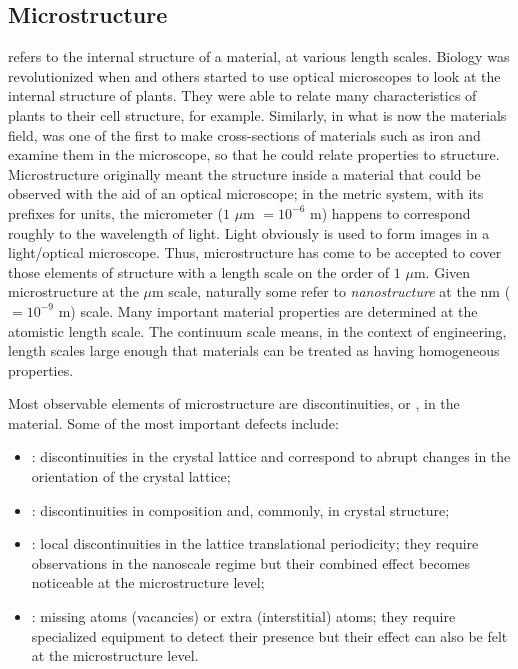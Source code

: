 \subsection{Microstructure\label{\chabbr:ssec:microstructures}}
 refers to the internal structure of a material, at various length scales.  Biology was revolutionized when  and others started to use optical microscopes to look at the internal structure of plants.  They were able to relate many characteristics of plants to their cell structure, for example.  Similarly, in what is now the materials field,  was one of the first to make cross-sections of materials such as iron and examine them in the microscope, so that he could relate properties to structure.  Microstructure originally meant the structure inside a material that could be observed with the aid of an optical microscope; in the metric system, with its prefixes for units, the micrometer ($1$ $\mu$m $= 10^{-6}$ m) happens to correspond roughly to the wavelength of light.  Light obviously is used to form images in a light/optical microscope.  Thus, microstructure has come to be accepted to cover those elements of structure with a length scale on the order of $1$ $\mu$m.  Given microstructure at the $\mu$m scale, naturally some refer to \textit{nanostructure} at the nm ($=10^{-9}$ m) scale.  Many important material properties are determined at the atomistic length scale. The continuum scale means, in the context of engineering, length scales large enough that materials can be treated as having homogeneous properties.

Most observable elements of microstructure are discontinuities, or , in the material.  Some of the most important defects include:
\begin{itemize}
	\item {}: discontinuities in the crystal lattice and correspond to abrupt changes in the orientation of the crystal lattice;
	\item {}:  discontinuities in composition and, commonly, in crystal structure;
	\item {}:  local discontinuities in the lattice translational periodicity; they require observations in the nanoscale regime but their combined effect becomes noticeable at the microstructure level;
	\item {}: missing atoms (vacancies) or extra (interstitial) atoms; they require specialized equipment to detect their presence but their effect can also be felt at the microstructure level.
\end{itemize}

